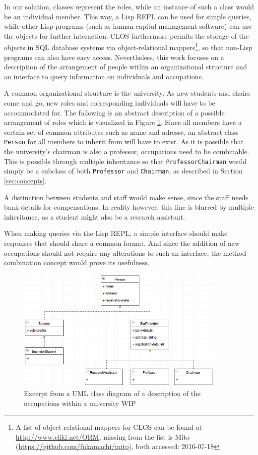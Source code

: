 \documentclass[oribibl]{llncs}
\begin{document}
In our solution, classes represent the roles, while an instance of such a class would be an individual member. This way, a Lisp REPL can be used for simple queries, while other Lisp-programs (such as human capital management software) can use the objects for further interaction. CLOS furthermore permits the storage of the objects in SQL database systems via object-relational mappers\footnote{A list of object-relational mappers for CLOS can be found at \url{http://www.cliki.net/ORM}, missing from the list is Mito (\url{https://github.com/fukamachi/mito}), both accessed: 2016-07-18}, so that non-Lisp programs can also have easy access. Nevertheless, this work focuses on a description of the arrangement of people within an organizational structure and  an interface to query information on individuals and occupations.
\newline

A common organizational structure is the university. As new students and chairs come and go, new roles and corresponding individuals will have to be accommodated for. The following is an abstract description of a possible arrangement of roles which is visualized in Figure \ref{fig:class-diagram}. Since all members have a certain set of common attributes such as name and adresse, an abstract class \texttt{Person} for all members to inherit from will have to exist. As it is possible that the university's chairman is also a professor, occupations need to be combinable. This is possible through multiple inheritance so that \texttt{ProfessorChairman} would simply be a subclass of both \texttt{Professor} and \texttt{Chairman}, as described in Section \ref{sec:concepts}. 

A distinction between students and staff would make sense, since the staff needs bank details for compensations. In reality however, this line is blurred by multiple inheritance, as a student might also be a research assistant.

When making queries via the Lisp REPL, a simple interface should make responses that should share a common format. And since the addition of new occupations should not require any alterations to such an interface, the method combination concept would prove its usefulness. 

\begin{figure}[]
    \centering
    \includegraphics[width=0.9\textwidth]{images/class-diagram.png}
    \caption{Excerpt from a UML class diagram of a description of the occupations within a university WIP}
    \label{fig:class-diagram}
\end{figure}
\end{document}
